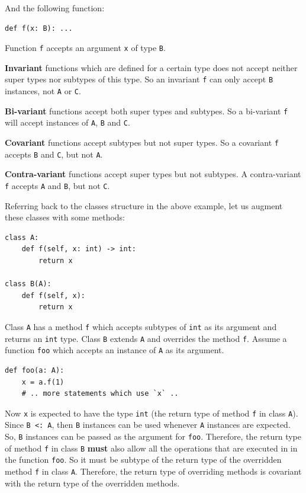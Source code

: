 And the following function:
\begin{lstlisting}
def f(x: B): ...
\end{lstlisting}

Function \lstinline|f| accepts an argument \lstinline|x| of type \lstinline|B|.

\textbf{Invariant} functions which are defined for a certain type does not accept neither super types nor subtypes of this type. So an invariant \lstinline|f| can only accept \lstinline|B| instances, not \lstinline|A| or \lstinline|C|.

\textbf{Bi-variant} functions accept both super types and subtypes. So a bi-variant \lstinline|f| will accept instances of \lstinline|A|, \lstinline|B| and \lstinline|C|.

\textbf{Covariant} functions accept subtypes but not super types. So a covariant \lstinline|f| accepts \lstinline|B| and \lstinline|C|, but not \lstinline|A|.

\textbf{Contra-variant} functions accept super types but not subtypes. A contra-variant \lstinline|f| accepts \lstinline|A| and \lstinline|B|, but not \lstinline|C|.

Referring back to the classes structure in the above example, let us augment these classes with some methods:

\begin{lstlisting}
class A:
	def f(self, x: int) -> int:
		return x
		
class B(A):
	def f(self, x):
		return x
\end{lstlisting}

Class \lstinline|A| has a method \lstinline|f| which accepts subtypes of \lstinline|int| as its argument and returns an \lstinline|int| type. Class \lstinline|B| extends \lstinline|A| and overrides the method \lstinline|f|. Assume a function \lstinline|foo| which accepts an instance of \lstinline|A| as its argument.

\begin{lstlisting}
def foo(a: A):
	x = a.f(1)
	# .. more statements which use `x` ..
\end{lstlisting}

Now \lstinline|x| is expected to have the type \lstinline|int| (the return type of method \lstinline|f| in class \lstinline|A|). Since \lstinline|B <: A|, then \lstinline|B| instances can be used whenever \lstinline|A| instances are expected. So, \lstinline|B| instances can be passed as the argument for \lstinline|foo|. Therefore, the return type of method \lstinline|f| in class \lstinline|B| \textbf{must} also allow all the operations that are executed in in the function \lstinline|foo|. So it must be subtype of the return type of the overridden method \lstinline|f| in class \lstinline|A|. Therefore, the return type of overriding methods is covariant with the return type of the overridden methods.

